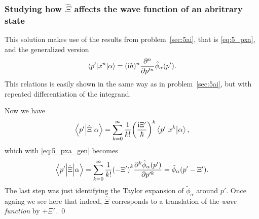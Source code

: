 \documentclass[11pt,letter, swedish, english
]{article}
\begin{document}
\subsubsection{Studying how $\hat\Xi$ affects the wave function of an
  abritrary state}
This solution makes use of the results from problem~\ref{sec:5ai},
that is \eqref{eq:5_pxa}, and the generalized version
\begin{equation}\label{eq:5_pxa_gen}
\mel**{p'}{x^n}{\alpha} 
= (\mathrm{i}\hbar)^n \frac{\partial^n}{\partial p'^n} \hat{\phi}_\alpha(p').
\end{equation}
This relations is easily shown in the same way as in
problem~\ref{sec:5ai}, but with repeated differentiation of the
integrand. 

Now we have
\begin{equation}
\mel**{p'}{\hat\Xi}{\alpha} 
= \sum_{k=0}^\infty \frac{1}{k!} \qty(\frac{\mathrm{i}\Xi'}{\hbar})^k\mel**{p'}{x^k}{\alpha},
\end{equation}
which with \eqref{eq:5_pxa_gen} becomes
\begin{equation}
\mel**{p'}{\hat\Xi}{\alpha} 
= \sum_{k=0}^\infty \frac{1}{k!} \qty(-\Xi')^k
       \frac{\partial^k \tilde\phi_\alpha(p')}{\partial p'^k}
= \tilde\phi_\alpha\qty(p'-\Xi').
\end{equation}
The last step was just identifying the Taylor expansion of
$\tilde\phi_\alpha$ around $p'$. 
Once againg we see here that indeed, $\hat\Xi$ corresponds to a
translation of the \emph{wave function} by $+\Xi'$.
\qed
\end{document}
